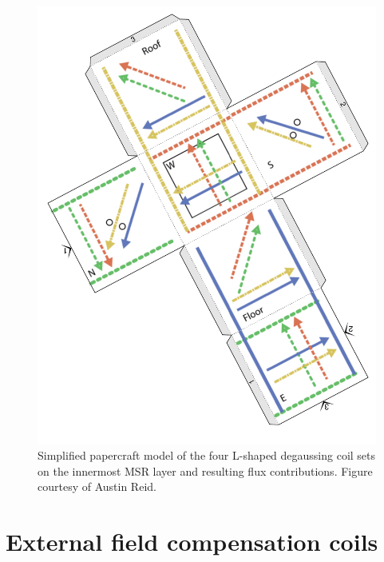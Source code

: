 \begin{figure}
    \centering
    \includegraphics[width=\textwidth]{figures/L5-papercube.pdf}
    \caption
    {Simplified papercraft model of the four L-shaped degaussing coil sets on the innermost MSR layer and resulting flux contributions. Figure courtesy of Austin Reid.}
    \label{fig:degaussing-paper-cube}
\end{figure}


\section{External field compensation coils}\label{sec:field-cage}


